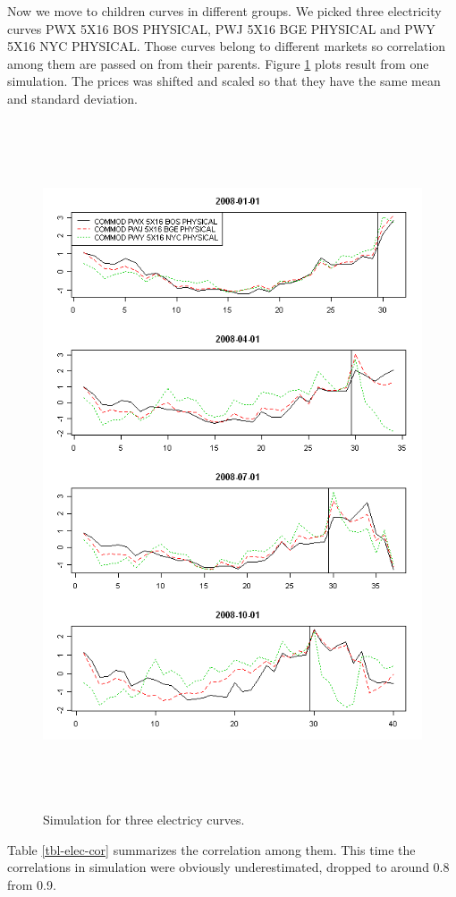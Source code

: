 Now we move to children curves in different groups.
We picked three electricity curves
PWX 5X16 BOS PHYSICAL, PWJ 5X16 BGE PHYSICAL
and PWY 5X16 NYC PHYSICAL.
Those curves belong to different markets
so correlation among them are passed on from their parents.
Figure \ref{three-elec} plots result from one simulation.
The prices was shifted and scaled 
so that they have the same mean and standard deviation.
\begin{figure}[htbp]
\centering
\includegraphics[width=5.5in, height=8in]{figures/elec-multicurve.png}
\caption{Simulation for three electricy curves.} 
\label{three-elec}
\end{figure}

Table \ref{tbl-elec-cor} summarizes the correlation among them.
This time the correlations in simulation were obviously
underestimated, dropped to around 0.8 from 0.9.

